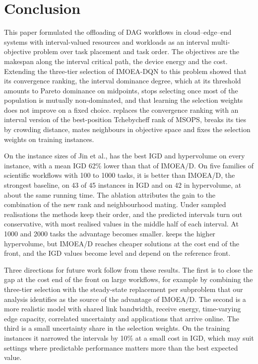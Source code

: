 \section{Conclusion}
\label{sec:conclusion}

This paper formulated the offloading of DAG workflows in cloud--edge--end systems with interval-valued resources and
workloads as an interval multi-objective problem over task placement and task order. The objectives are the makespan
along the interval critical path, the device energy and the cost. Extending the three-tier selection of IMOEA-DQN to this
problem showed that its convergence ranking, the interval dominance degree, which at its threshold amounts to Pareto
dominance on midpoints, stops selecting once most of the population is mutually non-dominated, and that learning the
selection weights does not improve on a fixed choice. \ours{} replaces
the convergence ranking with an interval version of the best-position Tchebycheff rank of MSOPS, breaks its ties by
crowding distance, mates neighbours in objective space and fixes the selection weights on training instances.

On the instance sizes of Jin et al., \ours{} has the best IGD and hypervolume on every instance, with a mean IGD 62\%
lower than that of IMOEA/D. On five families of scientific workflows with 100 to 1000 tasks, it is better than IMOEA/D,
the strongest baseline, on 43 of 45 instances in IGD and on 42 in hypervolume, at about the same running time. The
ablation attributes the gain to the combination of the new rank and neighbourhood mating. Under sampled realisations
the methods keep their order, and the predicted intervals turn out conservative, with most realised values in the
middle half of each interval. At 1000 and 2000 tasks the advantage
becomes smaller. \ours{} keeps the higher hypervolume, but IMOEA/D reaches cheaper solutions at the cost end of the
front, and the IGD values become level and depend on the reference front.

Three directions for future work follow from these results. The first is to close the gap at the cost end of the front
on large workflows, for example by combining the three-tier selection with the steady-state replacement per subproblem
that our analysis identifies as the source of the advantage of IMOEA/D. The second is a more realistic model with shared
link bandwidth, receive energy, time-varying edge capacity, correlated uncertainty and applications that arrive online.
The third is a small uncertainty share in the selection weights. On the training instances it narrowed the intervals by
10\% at a small cost in IGD, which may suit settings where predictable performance matters more than the best expected
value.
